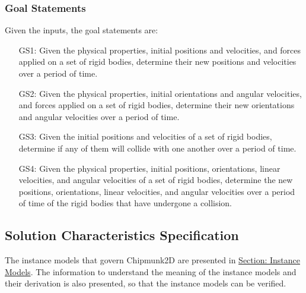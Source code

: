 \documentclass[12pt]{article}
\begin{document}
\subsubsection{Goal Statements}
\label{Sec:GoalStmt}
Given the inputs, the goal statements are:
\begin{itemize}
\item[GS1:]Given the physical properties, initial positions and velocities, and forces applied on a set of rigid bodies, determine their new positions and velocities over a period of time.
\item[GS2:]Given the physical properties, initial orientations and angular velocities, and forces applied on a set of rigid bodies, determine their new orientations and angular velocities over a period of time.
\item[GS3:]Given the initial positions and velocities of a set of rigid bodies, determine if any of them will collide with one another over a period of time.
\item[GS4:]Given the physical properties, initial positions, orientations, linear velocities, and angular velocities of a set of rigid bodies, determine the new positions, orientations, linear velocities, and angular velocities over a period of time of the rigid bodies that have undergone a collision.
\end{itemize}
\subsection{Solution Characteristics Specification}
\label{Sec:SolCharSpec}
The instance models that govern Chipmunk2D are presented in \hyperref[Sec:IMs]{Section: Instance Models}. The information to understand the meaning of the instance models and their derivation is also presented, so that the instance models can be verified.
\end{document}
